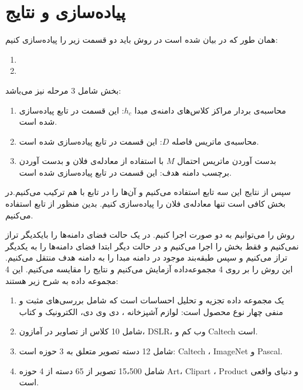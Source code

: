 	\section{پیاده‌سازی و نتایج}

همان طور که در 
\cite{wang2019easy}
بیان شده است در روش 
باید دو قسمت زیر را پیاده‌سازی کنیم:
\begin{enumerate}
	\item{}
	\item {}
\end{enumerate}

بخش 
شامل 3 مرحله نیز می‌باشد:
\begin{enumerate}
	\item{	
		محاسبه‌ی بردار مراکز کلاس‌های دامنه‌ی مبدا $h_c$: این قسمت در تابع 
		پیاده‌سازی شده است.}
	\item{
		محاسبه‌ی ماتریس فاصله $D$: این قسمت در تابع 
		پیاده‌سازی شده است.}
	\item{
		بدست آوردن ماتریس احتمال $M$ با استفاده از معادله‌ی فلان و بدست آوردن برچسب دامنه هدف: این قسمت در تابع 
	پیاده‌سازی شده است.}  
\end{enumerate}

سپس از نتایج این سه تابع استفاده می‌کنیم و آن‌ها را در تابع 
با هم ترکیب می‌کنیم.در بخش 
کافی است تنها معادله‌ی فلان را پیاده‌سازی کنیم. بدین منظور از تابع 
استفاده می‌کنیم.

روش
را می‌توانیم به دو صورت اجرا کنیم. در یک حالت فضای دامنه‌ها را بایکدیگر تراز نمی‌کنیم و فقط بخش 
را اجرا می‌کنیم و در حالت دیگر ابتدا فضای دامنه‌ها را به یکدیگر تراز می‌کنیم و سپس طبقه‌بند موجود در دامنه مبدا را به دامنه هدف منتقل می‌کنیم. این روش را بر روی 4 مجموعه‌داده آزمایش می‌کنیم و نتایج را مقایسه می‌کنیم. این 4 مجموعه داده به شرح زیر هستند:
\begin{enumerate}
	\item {
		یک مجموعه داده تجزیه و تحلیل احساسات است که شامل بررسی‌های مثبت و منفی چهار نوع محصول است: لوازم آشپزخانه ، دی وی دی، الکترونیک و کتاب}

	\item{
		شامل 10 کلاس از تصاویر در آمازون، DSLR، وب کم و Caltech است.
	}
	\item {
		شامل 12 دسته تصویر متعلق به 3 حوزه است: Caltech ، ImageNet  و Pascal.
	}

	\item {
		شامل 15،500 تصویر از 65 دسته از 4 حوزه Art، Clipart ، Product و دنیای واقعی است.
	}
\end{enumerate}

